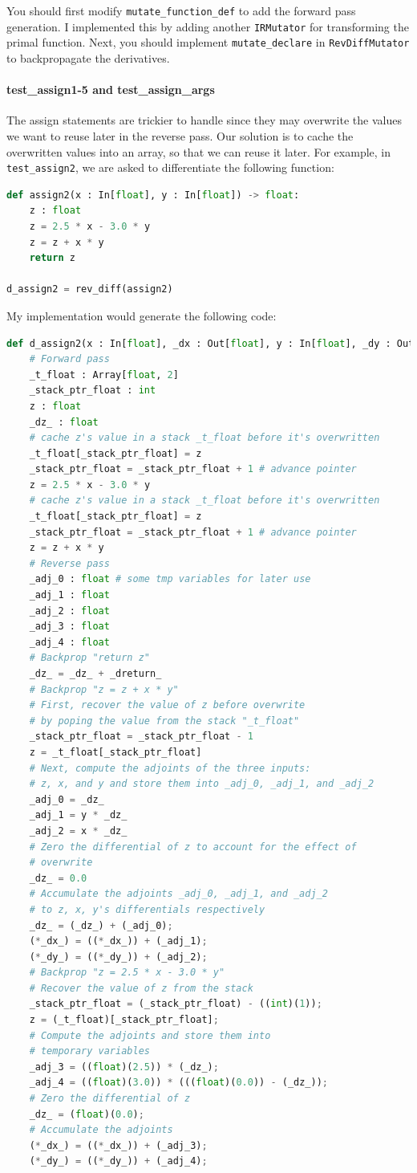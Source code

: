 You should first modify \lstinline{mutate_function_def} to add the forward pass generation. I implemented this by adding another \lstinline{IRMutator} for transforming the primal function. Next, you should implement \lstinline{mutate_declare} in \lstinline{RevDiffMutator} to backpropagate the derivatives.

\paragraph{test_assign1-5 and test_assign_args} The assign statements are trickier to handle since they may overwrite the values we want to reuse later in the reverse pass. Our solution is to cache the overwritten values into an array, so that we can reuse it later. For example, in \lstinline{test_assign2}, we are asked to differentiate the following function:
\begin{lstlisting}[language=Python]
def assign2(x : In[float], y : In[float]) -> float:
    z : float
    z = 2.5 * x - 3.0 * y
    z = z + x * y
    return z

d_assign2 = rev_diff(assign2)
\end{lstlisting}

My implementation would generate the following code:
\begin{lstlisting}[language=Python]
def d_assign2(x : In[float], _dx : Out[float], y : In[float], _dy : Out[float], _dreturn : In[float]):
	# Forward pass
	_t_float : Array[float, 2]
	_stack_ptr_float : int
	z : float
	_dz_ : float
	# cache z's value in a stack _t_float before it's overwritten
	_t_float[_stack_ptr_float] = z
	_stack_ptr_float = _stack_ptr_float + 1 # advance pointer
	z = 2.5 * x - 3.0 * y
	# cache z's value in a stack _t_float before it's overwritten
	_t_float[_stack_ptr_float] = z
	_stack_ptr_float = _stack_ptr_float + 1 # advance pointer
	z = z + x * y
	# Reverse pass
	_adj_0 : float # some tmp variables for later use
	_adj_1 : float
	_adj_2 : float
	_adj_3 : float
	_adj_4 : float
	# Backprop "return z"
	_dz_ = _dz_ + _dreturn_
	# Backprop "z = z + x * y"
	# First, recover the value of z before overwrite
	# by poping the value from the stack "_t_float"
	_stack_ptr_float = _stack_ptr_float - 1
	z = _t_float[_stack_ptr_float]
	# Next, compute the adjoints of the three inputs:
	# z, x, and y and store them into _adj_0, _adj_1, and _adj_2
	_adj_0 = _dz_
	_adj_1 = y * _dz_
	_adj_2 = x * _dz_
	# Zero the differential of z to account for the effect of
	# overwrite
	_dz_ = 0.0
	# Accumulate the adjoints _adj_0, _adj_1, and _adj_2
	# to z, x, y's differentials respectively
	_dz_ = (_dz_) + (_adj_0);
	(*_dx_) = ((*_dx_)) + (_adj_1);
	(*_dy_) = ((*_dy_)) + (_adj_2);
	# Backprop "z = 2.5 * x - 3.0 * y"
	# Recover the value of z from the stack
	_stack_ptr_float = (_stack_ptr_float) - ((int)(1));
	z = (_t_float)[_stack_ptr_float];
	# Compute the adjoints and store them into
	# temporary variables
	_adj_3 = ((float)(2.5)) * (_dz_);
	_adj_4 = ((float)(3.0)) * (((float)(0.0)) - (_dz_));
	# Zero the differential of z
	_dz_ = (float)(0.0);
	# Accumulate the adjoints
	(*_dx_) = ((*_dx_)) + (_adj_3);
	(*_dy_) = ((*_dy_)) + (_adj_4);
\end{lstlisting}

